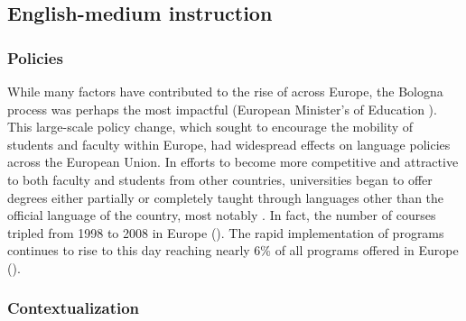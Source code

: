 \documentclass[output=paper]{langsci/langscibook}
\begin{document}
\subsection{English-medium instruction}
\subsubsection{Policies}

While many factors have contributed to the rise of  across Europe, the Bologna process was perhaps the most impactful (European Minister's of Education \citeyear{Bologna1999}). This large-scale policy change, which sought to encourage the mobility of students and faculty within Europe, had widespread effects on language policies across the European Union. In efforts to become more competitive and attractive to both faculty and students from other countries, universities began to offer degrees either partially or completely taught through languages other than the official language of the country, most notably  \citep{Coleman2006,LlurdaEtAl2013,Pérez-Vidal2015forall}. In fact, the number of  courses tripled from 1998 to 2008 in Europe (\citealt{WächterMaiworm2008}). The rapid implementation of  programs continues to rise to this day reaching nearly 6\% of all programs offered in Europe (\citealt{SmitDafouz2012,WächterMaiworm2014}).


\subsubsection{Contextualization}
\end{document}
